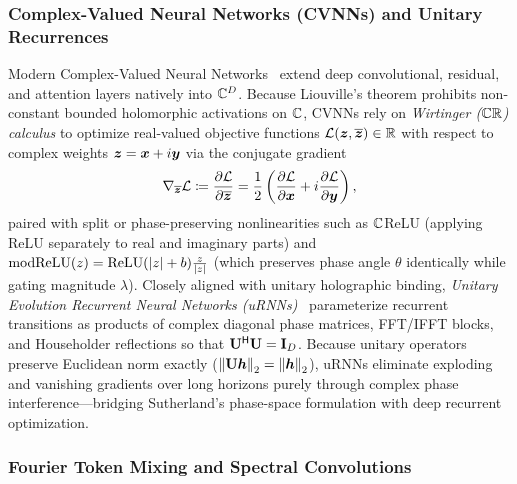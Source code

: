 \subsubsection{Complex-Valued Neural Networks (CVNNs) and Unitary Recurrences}

Modern Complex-Valued Neural Networks~\cite{BASSEY_CVNN_SURVEY,TRABELSI_2018_DCN} extend deep convolutional, residual, and attention layers natively into $\mathbb{C}^D$.
Because Liouville's theorem prohibits non-constant bounded holomorphic activations on $\mathbb{C}$, CVNNs rely on \emph{Wirtinger ($\mathbb{C}\mathbb{R}$) calculus} to optimize real-valued objective functions $\mathcal{L}(\boldsymbol{z}, \overline{\boldsymbol{z}}) \in \mathbb{R}$ with respect to complex weights $\boldsymbol{z} = \boldsymbol{x} + i\boldsymbol{y}$ via the conjugate gradient
\begin{equation}\label{eq:wirtinger}
    \nabla_{\overline{\boldsymbol{z}}} \mathcal{L}
    \coloneqq \frac{\partial \mathcal{L}}{\partial \overline{\boldsymbol{z}}}
    = \frac{1}{2}\left(\frac{\partial \mathcal{L}}{\partial \boldsymbol{x}} + i\frac{\partial \mathcal{L}}{\partial \boldsymbol{y}}\right),
\end{equation}
paired with split or phase-preserving nonlinearities such as $\mathbb{C}$ReLU (applying ReLU separately to real and imaginary parts) and $\mathrm{modReLU}(z) = \mathrm{ReLU}(\left\lvert z \right\rvert + b)\frac{z}{\left\lvert z \right\rvert}$ (which preserves phase angle $\theta$ identically while gating magnitude $\lambda$).
Closely aligned with unitary holographic binding, \emph{Unitary Evolution Recurrent Neural Networks (uRNNs)}~\cite{ARJOVSKY_2016_URNN} parameterize recurrent transitions as products of complex diagonal phase matrices, FFT/IFFT blocks, and Householder reflections so that $\mathbf{U}^{\mathsf{H}} \mathbf{U} = \mathbf{I}_D$.
Because unitary operators preserve Euclidean norm exactly ($\left\lVert \mathbf{U}\boldsymbol{h} \right\rVert_2 = \left\lVert \boldsymbol{h} \right\rVert_2$), uRNNs eliminate exploding and vanishing gradients over long horizons purely through complex phase interference---bridging Sutherland's phase-space formulation with deep recurrent optimization.

\subsubsection{Fourier Token Mixing and Spectral Convolutions}

